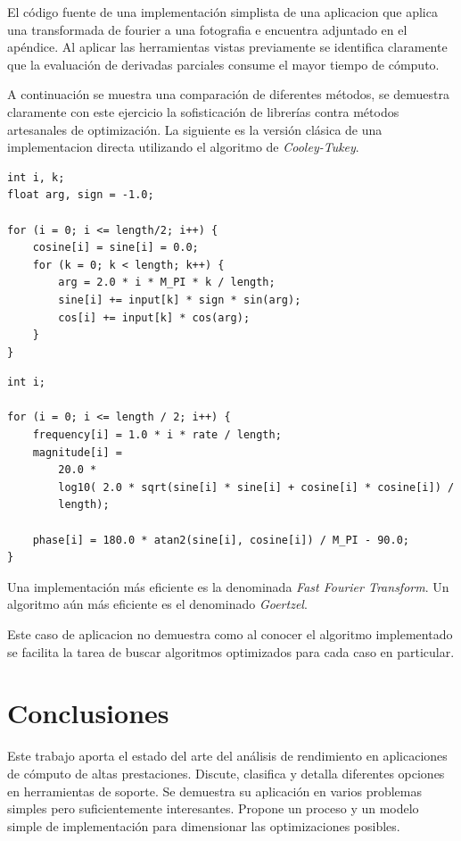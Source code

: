 \documentclass[a4paper]{report}
\begin{document}
\bigskip

El c\'odigo fuente de una implementaci\'on simplista de una aplicacion que aplica una transformada de fourier a una fotografia 
e encuentra adjuntado en el ap\'endice. Al aplicar las herramientas vistas previamente se identifica
claramente que la evaluaci\'on de derivadas parciales consume el mayor tiempo
de c\'omputo.

\bigskip

A continuaci\'on se muestra una comparaci\'on de diferentes m\'etodos, se
demuestra claramente con este ejercicio la sofisticaci\'on de librer\'ias
contra m\'etodos artesanales de optimizaci\'on. La siguiente es la versi\'on
cl\'asica de una implementacion directa utilizando el algoritmo de
{\it Cooley-Tukey}.

\begin{verbatim}
int i, k;
float arg, sign = -1.0;

for (i = 0; i <= length/2; i++) {
    cosine[i] = sine[i] = 0.0;
    for (k = 0; k < length; k++) {
        arg = 2.0 * i * M_PI * k / length;
        sine[i] += input[k] * sign * sin(arg);
        cos[i] += input[k] * cos(arg);
    }
}
\end{verbatim}

\begin{verbatim}
int i;

for (i = 0; i <= length / 2; i++) {
    frequency[i] = 1.0 * i * rate / length;
    magnitude[i] =
        20.0 *
        log10( 2.0 * sqrt(sine[i] * sine[i] + cosine[i] * cosine[i]) /
        length);

    phase[i] = 180.0 * atan2(sine[i], cosine[i]) / M_PI - 90.0;
}
\end{verbatim}

Una implementaci\'on m\'as eficiente es la denominada {\it Fast Fourier Transform}.
Un algoritmo a\'un m\'as eficiente es el denominado {\it Goertzel}.

\bigskip

Este caso de aplicacion no demuestra como al conocer el algoritmo implementado se
facilita la tarea de buscar algoritmos optimizados para cada caso en particular.

\chapter{Conclusiones}

Este trabajo aporta el estado del arte del an\'alisis de rendimiento en
aplicaciones de c\'omputo de altas prestaciones. Discute, clasifica y detalla
diferentes opciones en herramientas de soporte. Se demuestra su aplicaci\'on
en varios problemas simples pero suficientemente interesantes. Propone un
proceso y un modelo simple de implementaci\'on para dimensionar las
optimizaciones posibles.
\end{document}

